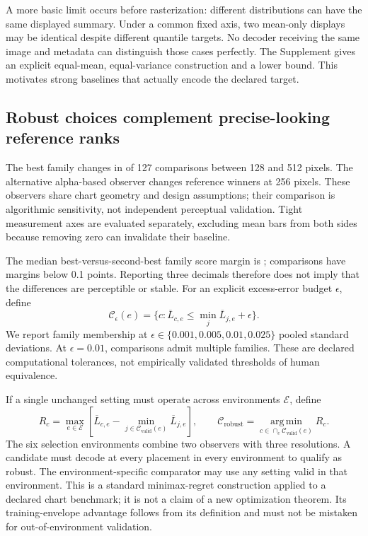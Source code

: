 \documentclass[11pt]{article}
\begin{document}
A more basic limit occurs before rasterization: different distributions can have the same displayed summary. Under a common fixed axis, two mean-only displays may be identical despite different quantile targets. No decoder receiving the same image and metadata can distinguish those cases perfectly. The Supplement gives an explicit equal-mean, equal-variance construction and a lower bound. This motivates strong baselines that actually encode the declared target.

\subsection*{Robust choices complement precise-looking reference ranks}
The best family changes in \ResolutionChanged{} of 127 comparisons between 128 and 512 pixels. The alternative alpha-based observer changes \ObserverChanged{} reference winners at 256 pixels. These observers share chart geometry and design assumptions; their comparison is algorithmic sensitivity, not independent perceptual validation. Tight measurement axes are evaluated separately, excluding mean bars from both sides because removing zero can invalidate their baseline.

The median best-versus-second-best family score margin is \MarginMedian{}; \SmallMargins{} comparisons have margins below 0.1 points. Reporting three decimals therefore does not imply that the differences are perceptible or stable. For an explicit excess-error budget $\epsilon$, define
\begin{equation}
\mathcal C_\epsilon(e)=\{c:\overline L_{c,e}\leq\min_j\overline L_{j,e}+\epsilon\}.
\end{equation}
We report family membership at $\epsilon\in\{0.001,0.005,0.01,0.025\}$ pooled standard deviations. At $\epsilon=0.01$, \NearCount{} comparisons admit multiple families. These are declared computational tolerances, not empirically validated thresholds of human equivalence.

If a single unchanged setting must operate across environments $\mathcal E$, define
\begin{equation}
R_c=\max_{e\in\mathcal E}\left[\overline L_{c,e}-\min_{j\in\mathcal C_{\mathrm{valid}}(e)}\overline L_{j,e}\right],
\qquad\mathcal C_{\mathrm{robust}}=\operatorname*{arg\,min}_{c\in\cap_e\mathcal C_{\mathrm{valid}}(e)}R_c.
\label{eq:regret}
\end{equation}
The six selection environments combine two observers with three resolutions. A candidate must decode at every placement in every environment to qualify as robust. The environment-specific comparator may use any setting valid in that environment. This is a standard minimax-regret construction applied to a declared chart benchmark; it is not a claim of a new optimization theorem. Its training-envelope advantage follows from its definition and must not be mistaken for out-of-environment validation.
\end{document}
